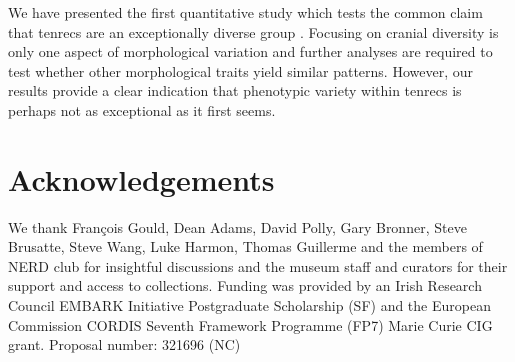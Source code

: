 \documentclass[12pt,a4paper]{article}
\begin{document}
	We have presented the first quantitative study which tests the common claim that tenrecs are an exceptionally diverse group \citep{Olson2013, Soarimalala2011,Eisenberg1969}. Focusing on cranial diversity is only one aspect of morphological variation and further analyses are required to test whether other morphological traits yield similar patterns. However, our results provide a clear indication that phenotypic variety within tenrecs is perhaps not as exceptional as it first seems.   
	
\section{Acknowledgements}

	We thank Fran\c{c}ois Gould, Dean Adams, David Polly, Gary Bronner, Steve Brusatte, Steve Wang, Luke Harmon, Thomas Guillerme and the members of NERD club for insightful discussions and the museum staff and curators for their support and access to collections. Funding was provided by an Irish Research Council EMBARK Initiative Postgraduate Scholarship (SF) and the European Commission CORDIS Seventh Framework Programme (FP7) Marie Curie CIG grant. Proposal number: 321696 (NC)





\end{document}
